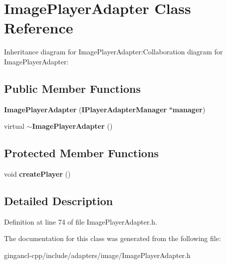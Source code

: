 \section{ImagePlayerAdapter Class Reference}
\label{classbr_1_1pucrio_1_1telemidia_1_1ginga_1_1ncl_1_1adapters_1_1image_1_1ImagePlayerAdapter}
Inheritance diagram for ImagePlayerAdapter:Collaboration diagram for ImagePlayerAdapter:\subsection*{Public Member Functions}
\begin{CompactItemize}
\item 
\textbf{ImagePlayerAdapter} ({\bf IPlayerAdapterManager} $\ast${\bf manager})\label{classbr_1_1pucrio_1_1telemidia_1_1ginga_1_1ncl_1_1adapters_1_1image_1_1ImagePlayerAdapter_daf8afd245561802419b27eb1020f73a}

\item 
virtual {\bf $\sim$ImagePlayerAdapter} ()\label{classbr_1_1pucrio_1_1telemidia_1_1ginga_1_1ncl_1_1adapters_1_1image_1_1ImagePlayerAdapter_9c1135b821a775dc99879dc9daf8563c}

\end{CompactItemize}
\subsection*{Protected Member Functions}
\begin{CompactItemize}
\item 
void \textbf{createPlayer} ()\label{classbr_1_1pucrio_1_1telemidia_1_1ginga_1_1ncl_1_1adapters_1_1image_1_1ImagePlayerAdapter_2fbb9533e3d66799b0a433c9298ea70f}

\end{CompactItemize}


\subsection{Detailed Description}




Definition at line 74 of file ImagePlayerAdapter.h.

The documentation for this class was generated from the following file:\begin{CompactItemize}
\item 
gingancl-cpp/include/adapters/image/ImagePlayerAdapter.h\end{CompactItemize}
